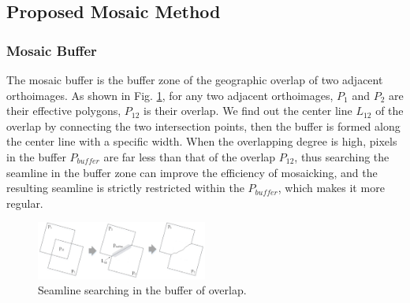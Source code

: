 \documentclass[journal]{IEEEtran}
\begin{document}
\subsection{Proposed Mosaic Method}
\subsubsection{Mosaic Buffer}
The mosaic buffer is the buffer zone of the geographic overlap of two adjacent orthoimages. As shown in Fig. \ref{fig:buffer}, for any two adjacent orthoimages, $P_1$ and $P_2$ are their effective polygons, $P_{12}$ is their overlap. We find out the center line $L_{12}$ of the overlap by connecting the two intersection points, then the buffer is formed along the center line with a specific width. When the overlapping degree is high, pixels in the buffer $P_{buffer}$ are far less than that of the overlap $P_{12}$, thus searching the seamline in the buffer zone can improve the efficiency of mosaicking, and the resulting seamline is strictly restricted within the $P_{buffer}$, which makes it more regular.
\begin{figure}[!t]
	\centering
	\includegraphics[width=0.5\textwidth]{buffer}
	\caption{Seamline searching in the buffer of overlap.}
	\label{fig:buffer}
\end{figure}
\end{document}
